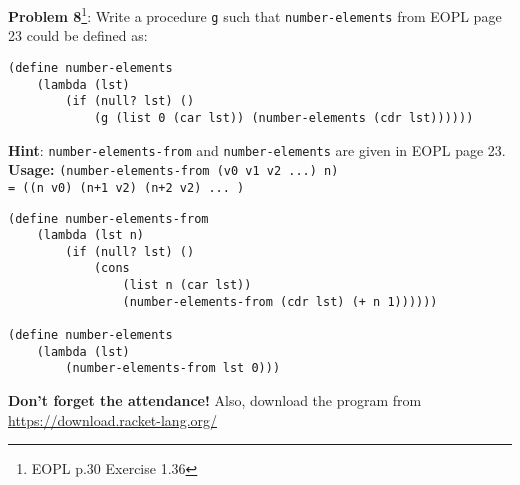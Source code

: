 \documentclass[12pt,reqno]{amsart}
\newcommand{\code}[1]{\texttt{#1}}
\begin{document}
\vspace{7.5mm}

\textbf{Problem 8}\footnote{EOPL p.30 Exercise 1.36}: Write a procedure \code{g} such that \code{number-elements} from EOPL page 23 could be defined as:
\begin{lstlisting}
(define number-elements
    (lambda (lst)
        (if (null? lst) ()
            (g (list 0 (car lst)) (number-elements (cdr lst))))))
\end{lstlisting}
\textbf{Hint}: \code{number-elements-from} and \code{number-elements} are given in EOPL page 23. \\
\textbf{Usage:} \code{(number-elements-from (v0 v1 v2 ...) n) \\ = ((n v0) (n+1 v2) (n+2 v2) ... )}
\begin{lstlisting}
(define number-elements-from 
    (lambda (lst n)
        (if (null? lst) ()
            (cons 
                (list n (car lst))
                (number-elements-from (cdr lst) (+ n 1))))))

(define number-elements
    (lambda (lst)
        (number-elements-from lst 0)))
\end{lstlisting}
\textbf{Don't forget the attendance!} Also, download the program from \url{https://download.racket-lang.org/}
\end{document}
